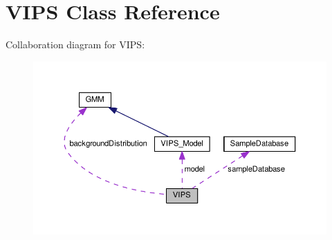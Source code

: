 \hypertarget{classVIPS}{}\section{V\+I\+PS Class Reference}
\label{classVIPS}


Collaboration diagram for V\+I\+PS\+:\nopagebreak
\begin{figure}[H]
\begin{center}
\leavevmode
\includegraphics[width=350pt]{classVIPS__coll__graph}
\end{center}
\end{figure}
